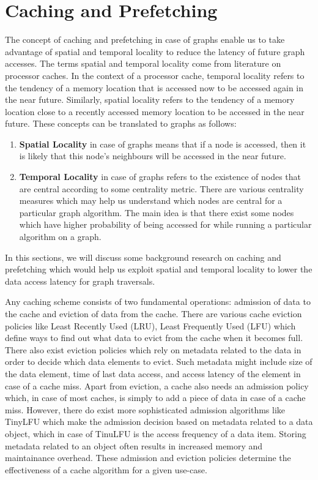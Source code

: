 \section{Caching and Prefetching}\label{sec:cachingDistSys}
The concept of caching and prefetching in case of graphs enable us to take
advantage of spatial and temporal locality to reduce the latency of future graph
accesses. The terms spatial and temporal locality come from literature on
processor caches. In the context of a processor cache, temporal locality refers
to the tendency of a memory location that is accessed now to be
accessed again in the near future. Similarly, spatial locality refers to the 
tendency of a memory location close to a recently accessed memory location to be
accessed in the near future. These concepts can be translated to graphs as
follows:
\begin{enumerate}
    \item \textbf{Spatial Locality} in case of graphs means that if a node is
        accessed, then it is likely that this node's neighbours will be accessed
        in the near future.
    \item \textbf{Temporal Locality} in case of graphs refers to the existence
        of nodes that are central according to some centrality metric. There are
        various centrality measures\cite{klein2010centrality} which may help us 
        understand which nodes are central for a particular graph algorithm. The
        main idea is that there exist some nodes which have higher probability
        of being accessed for while running a particular algorithm on a graph.
\end{enumerate}
In this sections, we will discuss some background research on caching and
prefetching which would help us exploit  spatial and temporal locality to lower
the data access latency for graph traversals.

Any caching scheme consists of two fundamental operations: admission of
data to the cache and eviction of data from the cache. There are various cache
eviction policies like Least Recently Used (LRU), Least Frequently Used (LFU)
which define ways to find out what data to evict from the cache when it becomes
full. There also exist eviction policies which rely on metadata related to the
data in order to decide which data elements to evict. Such metadata might
include size of the data element, time of last data access, and access latency
of the element in case of a cache miss. Apart from eviction, a cache also needs
an admission policy which, in case of most caches, is simply to add a piece of
data in case of a cache miss. However, there do exist more sophisticated
admission algorithms like TinyLFU\cite{einziger2017tinylfu} which make the
admission decision based on metadata related to a data object, which in case of
TinuLFU is the access frequency of a data item. Storing metadata related to an
object often results in increased memory and maintainance overhead. These
admission and eviction policies determine the effectiveness of a cache algorithm
for a given use-case.

